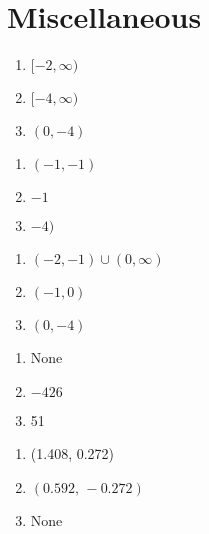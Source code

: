 \section*{Miscellaneous}

\begin{multicols}{3}
\begin{enumerate}
    \item $[-2, \infty)$
    \item $[-4, \infty)$
    \item $(0, -4)$
\end{enumerate}	\setcounter{Review}{\value{enumi}}
\end{multicols}
\begin{multicols}{3}
\begin{enumerate}	\setcounter{enumi}{\value{Review}} 
    \item $(-1,-1)$ 
    \item $-1$
    \item $-4)$
\end{enumerate}	\setcounter{Review}{\value{enumi}}
\end{multicols}
\begin{multicols}{3}
\begin{enumerate}	\setcounter{enumi}{\value{Review}} 
    \item $(-2, -1) \cup (0, \infty)$
    \item $(-1,0)$
    \item $(0,-4)$
\end{enumerate}	\setcounter{Review}{\value{enumi}}
\end{multicols}
\begin{multicols}{3}
\begin{enumerate}	\setcounter{enumi}{\value{Review}} 
    \item None
    \item $-426$
    \item 51
\end{enumerate}	\setcounter{Review}{\value{enumi}}
\end{multicols}
\begin{multicols}{3}
\begin{enumerate}	\setcounter{enumi}{\value{Review}} 
    \item (1.408, 0.272)
    \item $(0.592, \, -0.272)$
    \item None
\end{enumerate}	\setcounter{Review}{\value{enumi}}
\end{multicols}
